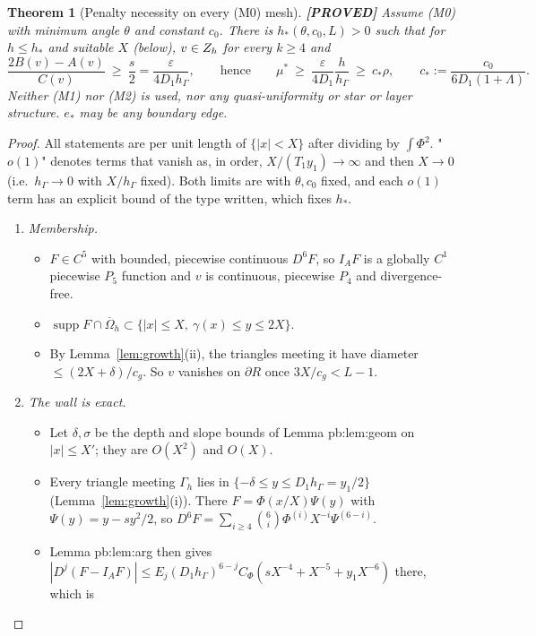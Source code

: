 \documentclass[11pt]{article}
\newtheorem{theorem}{Theorem}\newtheorem{lemma}[theorem]{Lemma}\newtheorem{corollary}[theorem]{Corollary}
\theoremstyle{remark}\newtheorem{remark}[theorem]{Remark}
\newcommand{\Oh}{\Omega_h}\newcommand{\Gh}{\Gamma_h}\newcommand{\hG}{h_\Gamma}\newcommand{\dn}{\partial_n}
\newcommand{\lab}[1]{\textbf{[#1]}}
\begin{document}
\begin{theorem}[Penalty necessity on every (M0) mesh]\label{thm:main}\lab{PROVED}
Assume (M0) with minimum angle $\theta$ and constant $c_0$. There is $h_\ast(\theta,c_0,L)>0$ such that for $h\le h_\ast$ and
suitable $X$ (below), $v\in Z_h$ for every $k\ge4$ and
\[\frac{2B(v)-A(v)}{C(v)}\ \ge\ \frac s2=\frac{\varepsilon}{4D_1\hG},\qquad\text{hence}\qquad
\mu^\ast\ \ge\ \frac{\varepsilon}{4D_1}\frac h{\hG}\ \ge\ c_\ast\rho,\qquad c_\ast:=\frac{c_0}{6D_1(1+\Lambda)} .\]
Neither (M1) nor (M2) is used, nor any quasi-uniformity or star or layer structure. $e_\ast$ may be any boundary edge.
\end{theorem}

\begin{proof}
All statements are per unit length of $\{|x|<X\}$ after dividing by $\int\Phi^2$. "$o(1)$" denotes terms that vanish as, in
order, $X/(T_1y_1)\to\infty$ and then $X\to0$ (i.e.\ $\hG\to0$ with $X/\hG$ fixed). Both limits are with $\theta,c_0$ fixed,
and each $o(1)$ term has an explicit bound of the type written, which fixes $h_\ast$.
\begin{enumerate}[label=\arabic*.]
\item \emph{Membership.}
  \begin{itemize}
  \item $F\in C^5$ with bounded, piecewise continuous $D^6F$, so $I_AF$ is a globally $C^1$ piecewise $P_5$ function and
    $v$ is continuous, piecewise $P_4$ and divergence-free.
  \item $\operatorname{supp}F\cap\overline\Oh\subset\{|x|\le X,\ \gamma(x)\le y\le2X\}$.
  \item By Lemma~\ref{lem:growth}(ii), the triangles meeting it have diameter $\le(2X+\delta)/c_g$. So $v$ vanishes on
    $\partial R$ once $3X/c_g<L-1$.
  \end{itemize}
\item \emph{The wall is exact.}
  \begin{itemize}
  \item Let $\delta,\sigma$ be the depth and slope bounds of Lemma pb:lem:geom on $|x|\le X'$; they are $O(X^2)$ and $O(X)$.
  \item Every triangle meeting $\Gh$ lies in $\{-\delta\le y\le D_1\hG=y_1/2\}$ (Lemma~\ref{lem:growth}(i)). There
    $F=\Phi(x/X)\Psi(y)$ with $\Psi(y)=y-sy^2/2$, so $D^6F=\sum_{i\ge4}\binom6i\Phi^{(i)}X^{-i}\Psi^{(6-i)}$.
  \item Lemma pb:lem:arg then gives $|D^j(F-I_AF)|\le E_j(D_1\hG)^{6-j}C_\Phi(sX^{-4}+X^{-5}+y_1X^{-6})$ there, which is

\end{itemize}
\end{enumerate}
\end{proof}
\end{document}
